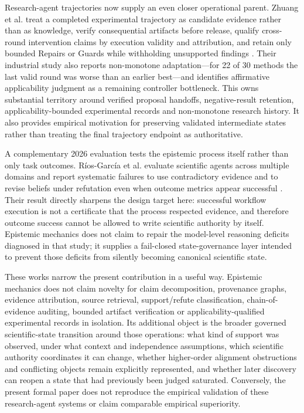 Research-agent trajectories now supply an even closer operational parent. Zhuang et al. treat a completed experimental trajectory as candidate evidence rather than as knowledge, verify consequential artifacts before release, qualify cross-round intervention claims by execution validity and attribution, and retain only bounded Repairs or Guards while withholding unsupported findings \cite{zhuang2026trajectory}. Their industrial study also reports non-monotone adaptation---for 22 of 30 methods the last valid round was worse than an earlier best---and identifies affirmative applicability judgment as a remaining controller bottleneck. This owns substantial territory around verified proposal handoffs, negative-result retention, applicability-bounded experimental records and non-monotone research history. It also provides empirical motivation for preserving validated intermediate states rather than treating the final trajectory endpoint as authoritative.

A complementary 2026 evaluation tests the epistemic process itself rather than only task outcomes. R\'ios-Garc\'ia et al. evaluate scientific agents across multiple domains and report systematic failures to use contradictory evidence and to revise beliefs under refutation even when outcome metrics appear successful \cite{riosgarcia2026}. Their result directly sharpens the design target here: successful workflow execution is not a certificate that the process respected evidence, and therefore outcome success cannot be allowed to write scientific authority by itself. Epistemic mechanics does not claim to repair the model-level reasoning deficits diagnosed in that study; it supplies a fail-closed state-governance layer intended to prevent those deficits from silently becoming canonical scientific state.

These works narrow the present contribution in a useful way. Epistemic mechanics does not claim novelty for claim decomposition, provenance graphs, evidence attribution, source retrieval, support/refute classification, chain-of-evidence auditing, bounded artifact verification or applicability-qualified experimental records in isolation. Its additional object is the broader governed scientific-state transition around those operations: what kind of support was observed, under what context and independence assumptions, which scientific authority coordinates it can change, whether higher-order alignment obstructions and conflicting objects remain explicitly represented, and whether later discovery can reopen a state that had previously been judged saturated. Conversely, the present formal paper does not reproduce the empirical validation of these research-agent systems or claim comparable empirical superiority.
